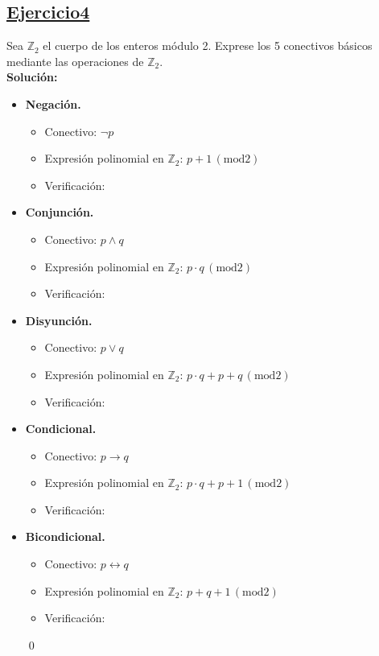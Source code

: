 \subsection*{\uline{Ejercicio4}}
Sea $\mathbb{Z}_2$ el cuerpo de los enteros módulo 2. Exprese los 5 conectivos básicos mediante las operaciones de $\mathbb{Z}_2$.\\

\textbf{Solución:}
\begin{itemize}
   \item \textbf{Negación.}
      \begin{itemize}
         \item Conectivo: $\neg p$
         \item Expresión polinomial en $\mathbb{Z}_2$: $p+1\,(\text{mod} 2)$
         \item Verificación:
            
      \end{itemize}
   \item \textbf{Conjunción.}
      \begin{itemize}
         \item Conectivo: $p \wedge q$
         \item Expresión polinomial en $\mathbb{Z}_2$: $p\cdot q\,(\text{mod} 2)$
         \item Verificación:
            
      \end{itemize}
   \item \textbf{Disyunción.}
      \begin{itemize}
         \item Conectivo: $p \vee q$
         \item Expresión polinomial en $\mathbb{Z}_2$: $p\cdot q+p+q\,(\text{mod} 2)$
         \item Verificación:
            
      \end{itemize}
   \item \textbf{Condicional.}
      \begin{itemize}
         \item Conectivo: $p \rightarrow q$
         \item Expresión polinomial en $\mathbb{Z}_2$: $p\cdot q+p+1\,(\text{mod} 2)$
         \item Verificación:
            
      \end{itemize}
   \item \textbf{Bicondicional.}
      \begin{itemize}
         \item Conectivo: $p \leftrightarrow q$
         \item Expresión polinomial en $\mathbb{Z}_2$: $p+q+1\,(\text{mod} 2)$
         \item Verificación:
            
      \end{itemize}
   \hfill \qed



\end{itemize}
